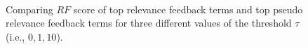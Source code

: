 \begin{figure}[t!]
\begin{centering}
 \hspace*{0.1cm}
  \\[-1ex]%

\par\end{centering}

\protect\caption{Comparing $\mathit{RF}$ score of top relevance feedback terms and top pseudo relevance feedback terms for three different values of the threshold $\tau$ (i.e., $0, 1, 10$).}
\label{fig:rf_prf}
\end{figure}

